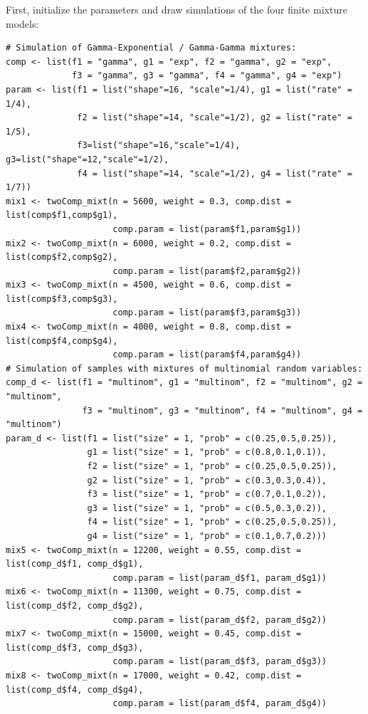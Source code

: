 First, initialize the parameters and draw simulations of the four finite mixture models:

\begin{verbatim}
# Simulation of Gamma-Exponential / Gamma-Gamma mixtures:
comp <- list(f1 = "gamma", g1 = "exp", f2 = "gamma", g2 = "exp",
             f3 = "gamma", g3 = "gamma", f4 = "gamma", g4 = "exp")
param <- list(f1 = list("shape"=16, "scale"=1/4), g1 = list("rate" = 1/4),
              f2 = list("shape"=14, "scale"=1/2), g2 = list("rate" = 1/5),
              f3=list("shape"=16,"scale"=1/4), g3=list("shape"=12,"scale"=1/2),
              f4 = list("shape"=14, "scale"=1/2), g4 = list("rate" = 1/7))
mix1 <- twoComp_mixt(n = 5600, weight = 0.3, comp.dist = list(comp$f1,comp$g1),
                     comp.param = list(param$f1,param$g1))
mix2 <- twoComp_mixt(n = 6000, weight = 0.2, comp.dist = list(comp$f2,comp$g2),
                     comp.param = list(param$f2,param$g2))
mix3 <- twoComp_mixt(n = 4500, weight = 0.6, comp.dist = list(comp$f3,comp$g3),
                     comp.param = list(param$f3,param$g3))
mix4 <- twoComp_mixt(n = 4000, weight = 0.8, comp.dist = list(comp$f4,comp$g4),
                     comp.param = list(param$f4,param$g4))
# Simulation of samples with mixtures of multinomial random variables:
comp_d <- list(f1 = "multinom", g1 = "multinom", f2 = "multinom", g2 = "multinom", 
               f3 = "multinom", g3 = "multinom", f4 = "multinom", g4 = "multinom")
param_d <- list(f1 = list("size" = 1, "prob" = c(0.25,0.5,0.25)), 
                g1 = list("size" = 1, "prob" = c(0.8,0.1,0.1)),
                f2 = list("size" = 1, "prob" = c(0.25,0.5,0.25)), 
                g2 = list("size" = 1, "prob" = c(0.3,0.3,0.4)),
                f3 = list("size" = 1, "prob" = c(0.7,0.1,0.2)), 
                g3 = list("size" = 1, "prob" = c(0.5,0.3,0.2)),
                f4 = list("size" = 1, "prob" = c(0.25,0.5,0.25)), 
                g4 = list("size" = 1, "prob" = c(0.1,0.7,0.2)))
mix5 <- twoComp_mixt(n = 12200, weight = 0.55, comp.dist = list(comp_d$f1, comp_d$g1),
                     comp.param = list(param_d$f1, param_d$g1))
mix6 <- twoComp_mixt(n = 11300, weight = 0.75, comp.dist = list(comp_d$f2, comp_d$g2),
                     comp.param = list(param_d$f2, param_d$g2))
mix7 <- twoComp_mixt(n = 15000, weight = 0.45, comp.dist = list(comp_d$f3, comp_d$g3),
                     comp.param = list(param_d$f3, param_d$g3))
mix8 <- twoComp_mixt(n = 17000, weight = 0.42, comp.dist = list(comp_d$f4, comp_d$g4),
                     comp.param = list(param_d$f4, param_d$g4))
\end{verbatim}

